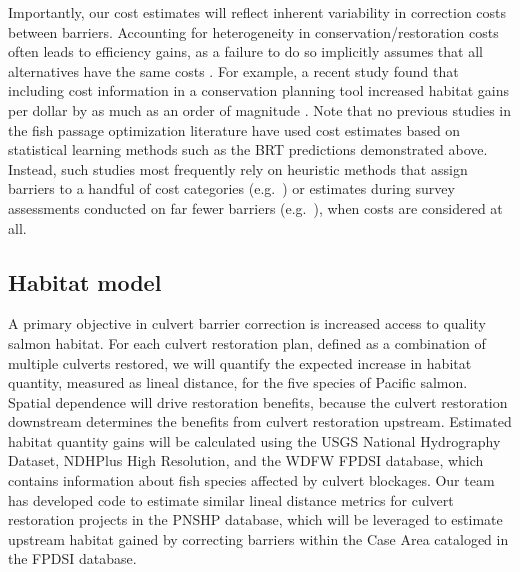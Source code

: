 \documentclass[12pt]{elsarticle}
\begin{document}
Importantly, our cost estimates will reflect inherent variability in correction costs between barriers. Accounting for heterogeneity in conservation/restoration costs often leads to efficiency gains, as a failure to do so implicitly assumes that all alternatives have the same costs \citep{babcock_targeting_1997,naidoo_integrating_2006}. For example, a recent study found that including cost information in a conservation planning tool increased habitat gains per dollar by as much as an order of magnitude \citep{field_quantifying_2019}. Note that no previous studies in the fish passage optimization literature have used cost estimates based on statistical learning methods such as the BRT predictions demonstrated above. Instead, such studies most frequently rely on heuristic methods that assign barriers to a handful of cost categories (e.g.\ \cite{hermoso_accessible_2021}) or estimates during survey assessments conducted on far fewer barriers (e.g.\ \citep{ohanley_restoring_2013,king_toolkit_2017}), when costs are considered at all. 

\subsection*{Habitat model}

A primary objective in culvert barrier correction is increased access to quality salmon habitat. For each culvert restoration plan, defined as a combination of multiple culverts restored, we will quantify the expected increase in habitat quantity, measured as lineal distance, for the five species of Pacific salmon. Spatial dependence will drive restoration benefits, because the culvert restoration downstream determines the benefits from culvert restoration upstream. Estimated habitat quantity gains will be calculated using the USGS National Hydrography Dataset, NDHPlus High Resolution, and the WDFW FPDSI database, which contains information about fish species affected by culvert blockages. Our team has developed code to estimate similar lineal distance metrics for culvert restoration projects in the PNSHP database, which will be leveraged to estimate upstream habitat gained by correcting barriers within the Case Area cataloged in the FPDSI database. 

\end{document}
